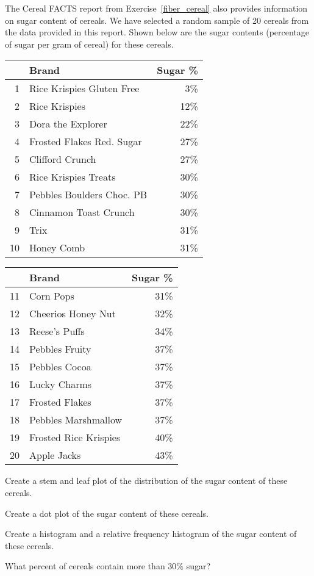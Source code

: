  The Cereal FACTS report from Exercise~\ref{fiber_cereal} also provides information on sugar content of cereals. We have selected a random sample of 20 cereals from the data provided in this report. Shown below are the sugar contents (percentage of sugar per gram of cereal) for these cereals.
\begin{center}
\begin{minipage}[c]{0.49\textwidth}
{\small
\begin{tabular}{rlr}
  \hline
 & Brand & Sugar \% \\ 
  \hline
1 & Rice Krispies Gluten Free & 3\% \\ 
  2 & Rice Krispies  & 12\% \\ 
  3 & Dora the Explorer  & 22\% \\ 
  4 & Frosted Flakes Red. Sugar & 27\% \\ 
  5 & Clifford Crunch  & 27\% \\ 
  6 & Rice Krispies Treats & 30\% \\ 
  7 & Pebbles Boulders Choc. PB & 30\% \\ 
  8 & Cinnamon Toast Crunch & 30\% \\ 
  9 & Trix  & 31\% \\ 
  10 & Honey Comb  & 31\% \\ 
   \hline
\end{tabular}
}
\end{minipage}  
 \begin{minipage}[c]{0.49\textwidth}
{\small
\begin{tabular}{rlr}
  \hline
 & Brand & Sugar \% \\ 
   \hline 
  11 & Corn Pops  & 31\% \\ 
  12 & Cheerios Honey Nut & 32\% \\ 
  13 & Reese's Puffs  & 34\% \\ 
  14 & Pebbles Fruity & 37\% \\ 
  15 & Pebbles Cocoa & 37\% \\ 
  16 & Lucky Charms  & 37\% \\ 
  17 & Frosted Flakes  & 37\% \\ 
  18 & Pebbles Marshmallow & 37\% \\ 
  19 & Frosted Rice Krispies & 40\% \\ 
  20 & Apple Jacks  & 43\% \\
   \hline
\end{tabular}
}
\end{minipage}  
\end{center}
\begin{parts}
\item Create a stem and leaf plot of the distribution of the sugar content of these cereals.
\item Create a dot plot of the sugar content of these cereals.
\item Create a histogram and a relative frequency histogram of the sugar content of these cereals.
\item What percent of cereals contain more than 30\% sugar?
\end{parts}
